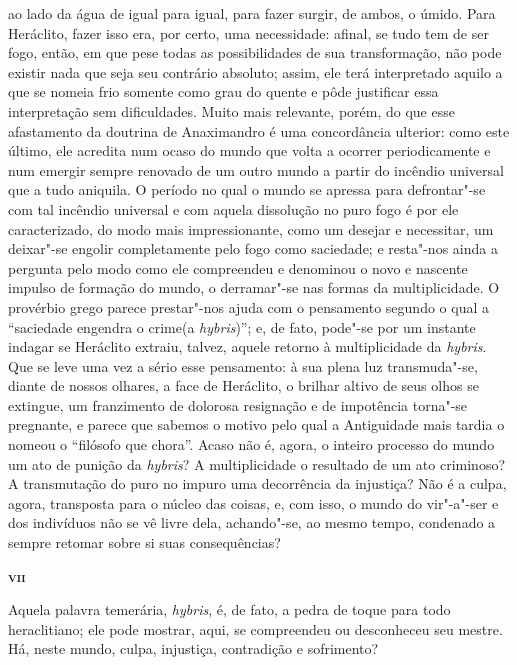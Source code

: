 ao lado da água de igual para igual, para fazer surgir, de ambos, o úmido.
Para Heráclito, fazer isso era, por certo, uma necessidade: afinal, se tudo
tem de ser fogo, então, em que pese todas as possibilidades de sua
transformação, não pode existir nada que seja seu contrário absoluto; assim,
ele terá interpretado aquilo a que se nomeia frio somente como grau do quente
e pôde justificar essa interpretação sem dificuldades. Muito mais relevante,
porém, do que esse afastamento da doutrina de Anaximandro é uma concordância
ulterior: como este último, ele acredita num ocaso do mundo que volta a
ocorrer periodicamente e num emergir sempre renovado de um outro mundo a
partir do incêndio universal que a tudo aniquila. O período no qual o mundo
se apressa para defrontar"-se com tal incêndio universal e com aquela
dissolução no puro fogo é por ele caracterizado, do modo mais impressionante,
como um desejar e necessitar, um deixar"-se engolir completamente pelo fogo
como saciedade; e resta"-nos ainda a pergunta pelo modo como ele compreendeu
e denominou o novo e nascente impulso de formação do mundo, o derramar"-se
nas formas da multiplicidade. O provérbio grego parece prestar"-nos ajuda com
o pensamento segundo o qual a ``saciedade engendra o crime(a \textit{hybris})''; 
e, de fato, pode"-se por um instante indagar se Heráclito extraiu, talvez, 
aquele retorno à multiplicidade da \textit{hybris}. Que se leve uma vez a sério 
esse pensamento: à sua plena luz transmuda"-se, diante de nossos olhares, a face 
de Heráclito, o brilhar altivo de seus olhos se extingue, um franzimento de dolorosa 
resignação e de impotência torna"-se pregnante, e parece que sabemos o motivo pelo qual 
a Antiguidade mais tardia o nomeou o ``filósofo que chora''. Acaso não é, agora, 
o inteiro processo do mundo um ato de punição da \textit{hybris}? A multiplicidade 
o resultado de um ato criminoso? A transmutação do puro no impuro uma decorrência da
injustiça? Não é a culpa, agora, transposta para o núcleo das coisas, e, com
isso, o mundo do vir"-a"-ser e dos indivíduos não se vê livre dela,
achando"-se, ao mesmo tempo, condenado a sempre retomar sobre si suas
consequências?

\bigskip
\textsc{\textbf{vii}}
\bigskip

Aquela palavra temerária, \textit{hybris}, é, de fato, a pedra de toque para
todo heraclitiano; ele pode mostrar, aqui, se compreendeu ou desconheceu seu
mestre. Há, neste mundo, culpa, injustiça, contradição e sofrimento?

